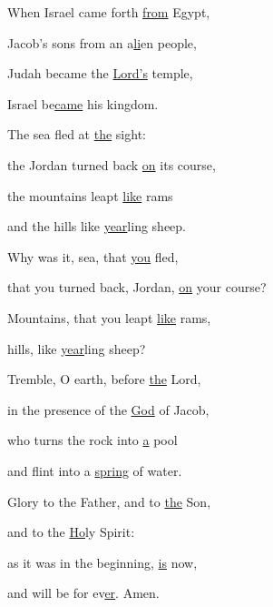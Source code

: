 \noindent When Israel came forth \uline{from} Egypt,~\GreStar{}~\nopagebreak

Jacob’s sons from an a\uline{li}en people,

\noindent Judah became the \uline{Lord’s} temple,~\GreStar{}~\nopagebreak

Israel be\uline{came} his kingdom.

\noindent The sea fled at \uline{the} sight:~\GreStar{}~\nopagebreak

the Jordan turned back \uline{on} its course,

\noindent the mountains leapt \uline{like} rams~\GreStar{}~\nopagebreak

and the hills like \uline{year}ling sheep.

\noindent Why was it, sea, that \uline{you} fled,~\GreStar{}~\nopagebreak

that you turned back, Jordan, \uline{on} your course?

\noindent Mountains, that you leapt \uline{like} rams,~\GreStar{}~\nopagebreak

hills, like \uline{year}ling sheep?

\noindent Tremble, O earth, before \uline{the} Lord,~\GreStar{}~\nopagebreak

in the presence of the \uline{God} of Jacob,

\noindent who turns the rock into \uline{a} pool~\GreStar{}~\nopagebreak

and flint into a \uline{spring} of water.

\noindent Glory to the Father, and to \uline{the} Son,~\GreStar{}~\nopagebreak

and to the \uline{Ho}ly Spirit:

\noindent as it was in the beginning, \uline{is} now,~\GreStar{}~\nopagebreak

and will be for ev\uline{er}. Amen.
